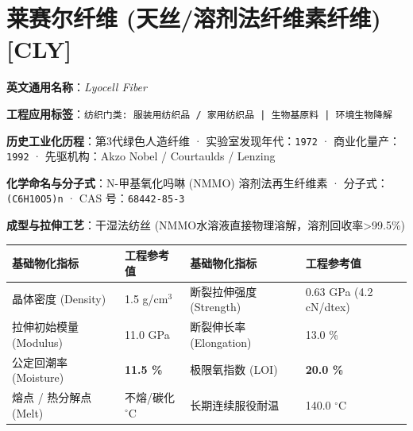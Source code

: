 \documentclass[11pt,openright,twoside,UTF8]{ctexbook}
\begin{document}
\section{莱赛尔纤维 (天丝/溶剂法纤维素纤维) [CLY]}
\label{sec:cly}

\noindent\textbf{英文通用名称}：\textit{Lyocell Fiber}\par
\noindent\textbf{工程应用标签}：\texttt{纺织门类: 服装用纺织品 / 家用纺织品 | 生物基原料 | 环境生物降解}\par
\noindent\textbf{历史工业化历程}：第3代绿色人造纤维 · 实验室发现年代：\texttt{1972} · 商业化量产：\texttt{1992} · 先驱机构：Akzo Nobel / Courtaulds / Lenzing\par
\noindent\textbf{化学命名与分子式}：N-甲基氧化吗啉 (NMMO) 溶剂法再生纤维素 · 分子式：\texttt{(C6H10O5)n} · CAS 号：\texttt{68442-85-3}\par
\noindent\textbf{成型与拉伸工艺}：干湿法纺丝 (NMMO水溶液直接物理溶解，溶剂回收率\textgreater{}99.5\%)\par

\vspace{0.15cm}
\begin{center}
\small
\begin{tabularx}{\textwidth}{p{3.8cm}Xp{3.8cm}X}
\toprule
\textbf{基础物化指标} & \textbf{工程参考值} & \textbf{基础物化指标} & \textbf{工程参考值} \\
\midrule
晶体密度 (Density) & 1.5 g/cm$^3$ & 断裂拉伸强度 (Strength) & 0.63 GPa (4.2 cN/dtex) \\
拉伸初始模量 (Modulus) & 11.0 GPa & 断裂伸长率 (Elongation) & 13.0 \% \\
公定回潮率 (Moisture) & \textbf{11.5 \%} & 极限氧指数 (LOI) & \textbf{20.0 \%} \\
熔点 / 热分解点 (Melt) & 不熔/碳化 $^\circ\mathrm{C}$ & 长期连续服役耐温 & 140.0 $^\circ\mathrm{C}$ \\
\bottomrule
\end{tabularx}
\end{center}
\vspace{0.15cm}
\end{document}

